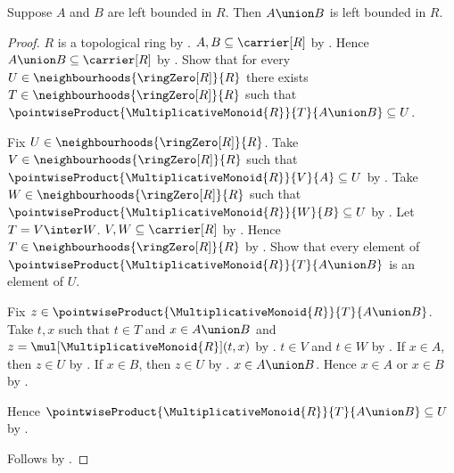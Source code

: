 \begin{proposition}\label{left_bounded_binary_union}
    Suppose $A$ and $B$ are left bounded in $R$.
    Then $A\union B$ is left bounded in $R$.
\end{proposition}
\begin{proof}
    $R$ is a topological ring by .
    $A,B\subseteq\carrier[R]$ by .
    Hence $A\union B\subseteq\carrier[R]$ by
        .
    Show that for every $U\in\neighbourhoods{\ringZero[R]}{R}$ there exists
        $T\in\neighbourhoods{\ringZero[R]}{R}$ such that
        $\pointwiseProduct{\MultiplicativeMonoid{R}}{T}{A\union B}
            \subseteq U$.
    \begin{subproof}
        Fix $U\in\neighbourhoods{\ringZero[R]}{R}$.
        Take $V\in\neighbourhoods{\ringZero[R]}{R}$ such that
            $\pointwiseProduct{\MultiplicativeMonoid{R}}{V}{A}\subseteq U$ by
            .
        Take $W\in\neighbourhoods{\ringZero[R]}{R}$ such that
            $\pointwiseProduct{\MultiplicativeMonoid{R}}{W}{B}\subseteq U$ by
            .
        Let $T=V\inter W$.
        $V,W\subseteq\carrier[R]$ by
            .
        Hence $T\in\neighbourhoods{\ringZero[R]}{R}$ by
            .
        Show that every element of
            $\pointwiseProduct{\MultiplicativeMonoid{R}}{T}{A\union B}$ is
            an element of $U$.
        \begin{subproof}
            Fix $z\in
                \pointwiseProduct{\MultiplicativeMonoid{R}}{T}{A\union B}$.
            Take $t,x$ such that $t\in T$ and $x\in A\union B$ and
                $z=\mul[\MultiplicativeMonoid{R}](t,x)$ by
                .
            $t\in V$ and $t\in W$ by .
            If $x\in A$, then $z\in U$ by
                .
            If $x\in B$, then $z\in U$ by
                .
            $x\in A\union B$.
            Hence $x\in A$ or $x\in B$ by .
        \end{subproof}
        Hence
            $\pointwiseProduct{\MultiplicativeMonoid{R}}{T}{A\union B}
                \subseteq U$ by .
    \end{subproof}
    Follows by .
\end{proof}

